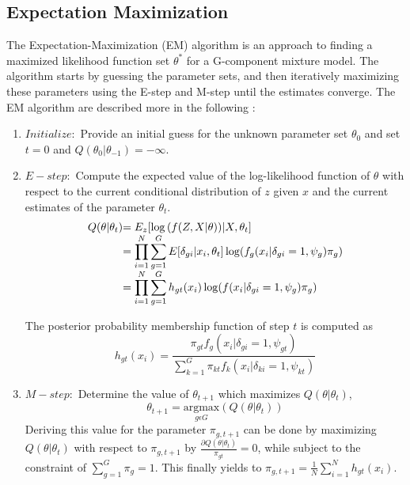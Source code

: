 \subsection{Expectation Maximization}
\label{sec:em}
The Expectation-Maximization (EM) algorithm is an approach to finding a maximized likelihood function set \(\theta^*\) for a G-component mixture model. The algorithm starts by guessing the parameter sets, and then iteratively maximizing these parameters using the E-step and M-step until the estimates converge. The EM algorithm are described more in the following :
\begin{enumerate}
    \item \(\mathit{Initialize: }\) Provide an initial guess for the unknown parameter set \(\theta_0\) and set \(t=0\) and \(Q(\theta_0|\theta_{-1})=-\infty\).
    
    \item \(\mathit{E-step: }\) Compute the expected value of the log-likelihood function of \(\theta\) with respect to the current conditional distribution of \(z\) given \(x\) and the current estimates of the parameter \(\theta_t\).
    \begin{equation}        
        \begin{array}{l@{} >{\displaystyle}l}
        Q(\theta|\theta_t) & = E_z[\log{(f(Z,X|\theta))} | X, \theta_t] \\ 
                           & = \prod_{i=1}^{N}\sum_{g=1}^{G}E[\delta_{gi}|x_i,\theta_t] \log(f_g(x_i|\delta_{gi}=1, \psi_g) \pi_g) \\ 
                           & = \prod_{i=1}^{N}\sum_{g=1}^{G}h_{gt}(x_i) \log(f(x_i|\delta_{gi}=1, \psi_g) \pi_g) \\ 
        \end{array}
    \end{equation}
    
    The posterior probability membership function of step \(t\) is computed as
        \begin{equation}
            \displaystyle
            h_{gt}(x_i) = \frac{\pi_{gt}f_g(x_i|\delta_{gi}=1,\psi_{gt})}{\sum_{k=1}^{G}\pi_{kt}f_k(x_i|\delta_{ki}=1,\psi_{kt})}
        \end{equation}

    \item \(\mathit{M-step: }\) Determine the value of \(\theta_{t+1}\) which maximizes \(Q(\theta|\theta_t)\),
    \[
        \theta_{t+1}=\underset{g\epsilon G}{\mathrm{argmax}}{(Q(\theta|\theta_t))}
    \] 
    Deriving this value for the parameter \(\pi_{g,t+1}\) can be done by maximizing \(Q(\theta|\theta_t)\) with respect to \(\pi_{g,t+1}\) by \(\frac{\partial Q(\theta|\theta_t)}{\pi_{gt}}=0\), while subject to the constraint of \(\sum_{g=1}^{G}\pi_g=1\). 
    This finally yields to \(\pi_{g,t+1}=\frac{1}{N}\sum_{i=1}^{N}h_{gt}(x_i)\).


\end{enumerate}
